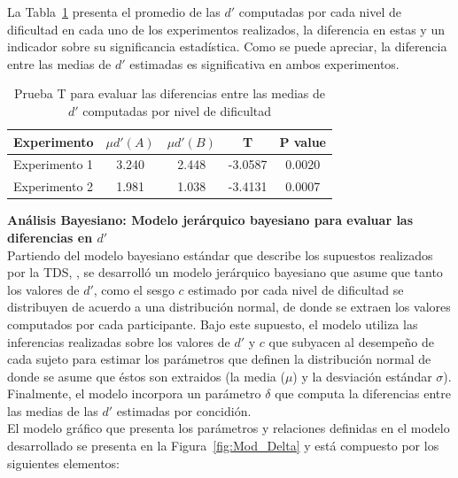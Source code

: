 La Tabla~\ref{Tabla_t-HitsyFA} presenta el promedio de las $d'$ computadas por cada nivel de dificultad en cada uno de los experimentos realizados, la diferencia en estas y un indicador sobre su significancia estadística. Como se puede apreciar, la diferencia entre las medias de $d'$ estimadas es significativa en ambos experimentos.\\

\begin{table}
\caption[Prueba T para evaluar las diferencias entre las medias de $d'$ por nivel de dificultad]{Prueba T para evaluar las diferencias entre las medias de $d'$ computadas por nivel de dificultad}
\label{Tabla_t-HitsyFA}
\centering
\begin{tabular}{l | c c c c}
\toprule
\textbf{Experimento} & \textbf{$\mu d'(A)$} & \textbf{$\mu d'(B)$} & \textbf{T}  & \textbf{P value}\\
\midrule
Experimento 1 & 3.240 & 2.448 & -3.0587 & 0.0020 \\
Experimento 2 & 1.981 & 1.038 & -3.4131 & 0.0007 \\
\bottomrule
\end{tabular}
\end{table}


\textbf{Análisis Bayesiano: Modelo jerárquico bayesiano para evaluar las diferencias en $d'$}\\

Partiendo del modelo bayesiano estándar que describe los supuestos realizados por la TDS, \parencite{LeeBook}, se desarrolló un modelo jerárquico bayesiano que asume que tanto los valores de $d'$, como el sesgo $c$ estimado por cada nivel de dificultad se distribuyen de acuerdo a una distribución normal, de donde se extraen los valores computados por cada participante. Bajo este supuesto, el modelo utiliza las inferencias realizadas sobre los valores de $d'$ y $c$ que subyacen al desempeño de cada sujeto para estimar los parámetros que definen la distribución normal de donde se asume que éstos son extraidos (la media ($\mu$) y la desviación estándar $\sigma$). Finalmente, el modelo incorpora un parámetro $\delta$ que computa la diferencias entre las medias de las $d'$ estimadas por concidión.\\

El modelo gráfico que presenta los parámetros y relaciones definidas en el modelo desarrollado se presenta en la Figura~\ref{fig:Mod_Delta} y está compuesto por los siguientes elementos:\\

